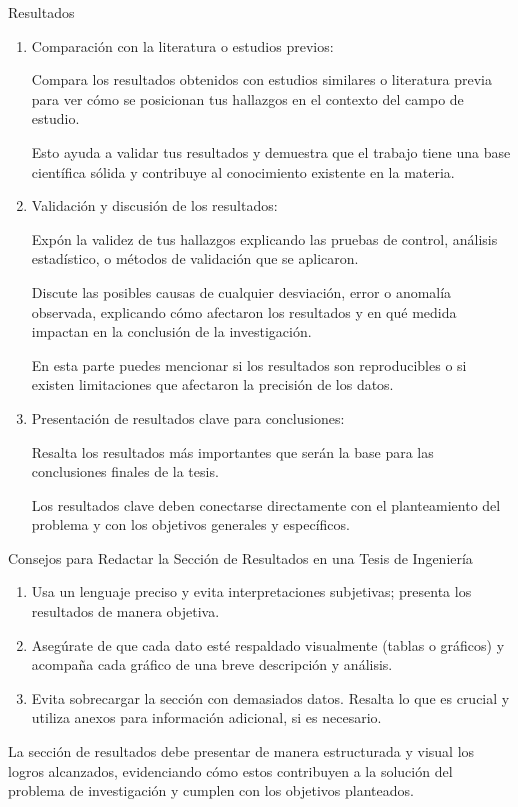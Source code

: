 \documentclass[9pt]{beamer}
\begin{document}
\begin{frame}{Resultados}
\begin{enumerate}
    \item Comparación con la literatura o estudios previos:

    Compara los resultados obtenidos con estudios similares o literatura previa para ver cómo se posicionan tus hallazgos en el contexto del campo de estudio.

    Esto ayuda a validar tus resultados y demuestra que el trabajo tiene una base científica sólida y contribuye al conocimiento existente en la materia.

    \item Validación y discusión de los resultados:

    Expón la validez de tus hallazgos explicando las pruebas de control, análisis estadístico, o métodos de validación que se aplicaron.

    Discute las posibles causas de cualquier desviación, error o anomalía observada, explicando cómo afectaron los resultados y en qué medida impactan en la conclusión de la investigación.

    En esta parte puedes mencionar si los resultados son reproducibles o si existen limitaciones que afectaron la precisión de los datos.

    \item Presentación de resultados clave para conclusiones:

    Resalta los resultados más importantes que serán la base para las conclusiones finales de la tesis.

    Los resultados clave deben conectarse directamente con el planteamiento del problema y con los objetivos generales y específicos.
\end{enumerate}

Consejos para Redactar la Sección de Resultados en una Tesis de Ingeniería

\begin{enumerate}
    \item Usa un lenguaje preciso y evita interpretaciones subjetivas; presenta los resultados de manera objetiva.
    \item Asegúrate de que cada dato esté respaldado visualmente (tablas o gráficos) y acompaña cada gráfico de una breve descripción y análisis.
    \item Evita sobrecargar la sección con demasiados datos. Resalta lo que es crucial y utiliza anexos para información adicional, si es necesario.
\end{enumerate}

La sección de resultados debe presentar de manera estructurada y visual los logros alcanzados, evidenciando cómo estos contribuyen a la solución del problema de investigación y cumplen con los objetivos planteados.
\end{frame}
\end{document}
